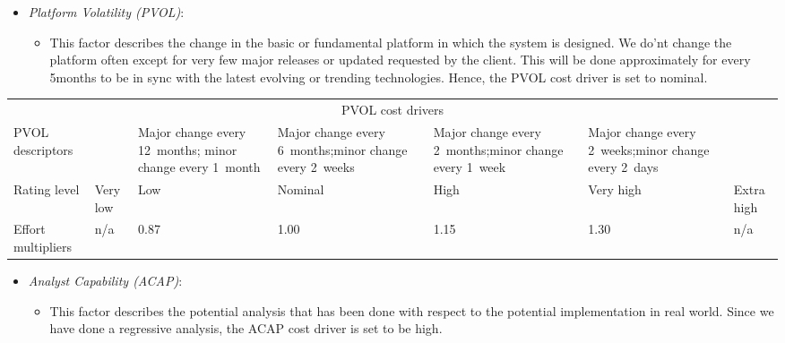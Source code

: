\begin{itemize}
	\item \emph{Platform Volatility (PVOL)}:
	\begin{itemize}
		\item[] This factor describes the change in the basic or fundamental platform in which the system is designed. We do'nt change the platform often except for very few major releases or updated requested by the client. This will be done approximately for every 5months to be in sync with the latest evolving or trending technologies. Hence, the PVOL cost driver is set to nominal.
	\end{itemize}
\end{itemize}

\begin{table}[H]
	\hspace*{-1.7cm}
	\begin{tabular}{|p{2cm}|p{2cm}|p{2cm}|p{2cm}|p{2cm}|p{2cm}|p{2cm}|}
		\hline
		\multicolumn{7}{|c|}{PVOL cost drivers} \\
		\hhline{|=======|}
		PVOL descriptors & & Major change every 12~months; minor change every 1~month & Major change every 6~months;\newline minor change every 2~weeks & Major change every 2~months;\newline minor change every 1~week & Major change every 2~weeks;\newline minor change every 2~days & \\
		\hline
		Rating level & Very low & Low & Nominal & High & Very high & Extra high \\
		\hline
		Effort multipliers & n/a & 0.87 & 1.00 & 1.15 & 1.30 & n/a \\
		\hline
	\end{tabular}
\end{table}

\begin{itemize}
	\item \emph{Analyst Capability (ACAP)}:
	\begin{itemize}
		\item[] This factor describes the potential analysis that has been done with respect to the potential implementation in real world. Since we have done a regressive analysis, the ACAP cost driver is set to be high.
	\end{itemize}
\end{itemize}

